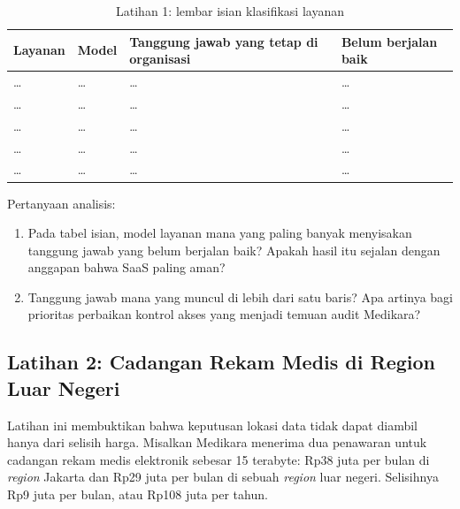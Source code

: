 \begin{table}[!htb]
  \centering
  \caption{Latihan 1: lembar isian klasifikasi layanan}
  \label{tab:ch02-lat1-hasil}
  \small
  \begin{tabularx}{\textwidth}{>{\raggedright\arraybackslash}p{2.6cm}
      >{\raggedright\arraybackslash}p{1.1cm} >{\raggedright\arraybackslash}X
      >{\raggedright\arraybackslash}p{2.6cm}}
    \hline
    \textbf{Layanan} & \textbf{Model} & \textbf{Tanggung jawab yang tetap di organisasi} &
      \textbf{Belum berjalan baik} \\
    \hline
    \dots & \dots & \dots & \dots \\
    \hline
    \dots & \dots & \dots & \dots \\
    \hline
    \dots & \dots & \dots & \dots \\
    \hline
    \dots & \dots & \dots & \dots \\
    \hline
    \dots & \dots & \dots & \dots \\
    \hline
  \end{tabularx}
\end{table}

Pertanyaan analisis:
\begin{enumerate}
  \item Pada tabel isian, model layanan mana yang paling banyak menyisakan tanggung jawab
        yang belum berjalan baik? Apakah hasil itu sejalan dengan anggapan bahwa SaaS
        paling aman?
  \item Tanggung jawab mana yang muncul di lebih dari satu baris? Apa artinya bagi prioritas
        perbaikan kontrol akses yang menjadi temuan audit Medikara?
\end{enumerate}

\subsection*{Latihan 2: Cadangan Rekam Medis di Region Luar Negeri}

Latihan ini membuktikan bahwa keputusan lokasi data tidak dapat diambil hanya dari selisih
harga. Misalkan Medikara menerima dua penawaran untuk cadangan rekam medis elektronik
sebesar 15 terabyte: Rp38 juta per bulan di \textit{region} Jakarta dan Rp29 juta per bulan
di sebuah \textit{region} luar negeri. Selisihnya Rp9 juta per bulan, atau Rp108 juta per
tahun.

